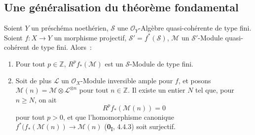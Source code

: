 \subsection{Une généralisation du théorème fondamental}
\label{subsection:III.2.4-fr}

\begin{theorem}[2.4.1]
\label{III.2.4.1-fr}
Soient $Y$ un préschéma noethérien, $\mathcal S$ une
$\mathcal O_Y$-Algèbre quasi-cohérente de type fini. Soient
$f:X\to Y$ un morphisme projectif, $\mathcal S'=f^*(\mathcal S)$,
$\mathcal M$ un $\mathcal S'$-Module quasi-cohérent de type fini.
Alors~:
\begin{enumerate}
\item[\textup{(i)}] Pour tout $p\in\mathbb Z$, $R^pf_*(\mathcal M)$ est un
$\mathcal S$-Module de type fini.
\item[\textup{(ii)}] Soit de plus $\mathcal L$ un $\mathcal O_X$-Module inversible
ample pour $f$, et posons
$\mathcal M(n)=\mathcal M\otimes\mathcal L^{\otimes n}$ pour tout
$n\in\mathbb Z$. Il existe un entier $N$ tel que, pour $n\geq N$, on ait
\[
R^pf_*(\mathcal M(n))=0
\tag{2.4.1.1}\label{III.2.4.1.1-fr}
\]
pour tout $p>0$, et que l'homomorphisme canonique
$f^*(f_*(\mathcal M(n))\longrightarrow\mathcal M(n)$
\textup{(\textbf{0}\textsubscript{I}, 4.4.3)} soit surjectif.
\end{enumerate}
\end{theorem}

